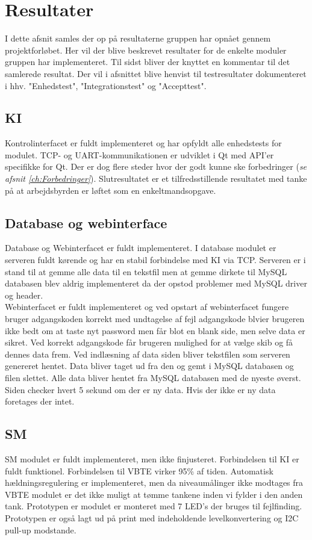 \section{Resultater}
\label{ch:Resultater}
I dette afsnit samles der op på resultaterne gruppen har opnået gennem projektforløbet. Her vil der blive beskrevet resultater for de enkelte moduler gruppen har implementeret. Til sidst bliver der knyttet en kommentar til det samlerede resultat. Der vil i afsnittet blive henvist til testresultater dokumenteret i hhv. "Enhedstest", "Integrationstest" og "Accepttest".

\subsection{KI}
Kontrolinterfacet er fuldt implementeret og har opfyldt alle enhedstests for modulet. TCP- og UART-kommunikationen er udviklet i Qt med API'er specifikke for Qt. Der er dog flere steder hvor der godt kunne ske forbedringer (\textit{se afsnit \ref{ch:Forbedringer}}). Slutresultatet er et tilfredsstillende resultatet med tanke på at arbejdsbyrden er løftet som en enkeltmandsopgave.\\

\subsection{Database og webinterface}
Database og Webinterfacet er fuldt implementeret. I database modulet er serveren fuldt kørende og har en stabil forbindelse med KI via TCP. Serveren er i stand til at gemme alle data til en tekstfil men at gemme dirkete til MySQL databasen blev aldrig implementeret da der opstod problemer med MySQL driver og header.\\
Webinterfacet er fuldt implementeret og ved opstart af webinterfacet fungere bruger adgangskoden korrekt med undtagelse af fejl adgangskode blvier brugeren ikke bedt om at taste nyt password men får blot en blank side, men selve data er sikret. Ved korrekt adgangskode får brugeren mulighed for at vælge skib og få dennes data frem. Ved indlæsning af data siden bliver tekstfilen som serveren genereret hentet. Data bliver taget ud fra den og gemt i MySQL databasen og filen slettet. Alle data bliver hentet fra MySQL databasen med de nyeste øverst. Siden checker hvert 5 sekund om der er ny data. Hvis der ikke er ny data foretages der intet.

\subsection{SM}
SM modulet er fuldt implementeret, men ikke finjusteret. Forbindelsen til KI er fuldt funktionel. Forbindelsen til VBTE virker 95\% af tiden. Automatisk hældningsregulering er implementeret, men da niveaumålinger ikke modtages fra VBTE modulet er det ikke muligt at tømme tankene inden vi fylder i den anden tank. Prototypen er modulet er monteret med 7 LED's der bruges til fejlfinding. Prototypen er også lagt ud på print med indeholdende levelkonvertering og I2C pull-up modstande.

